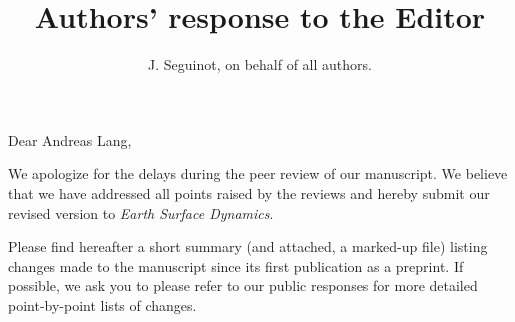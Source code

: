 


\title{Authors' response to the Editor}
\author{J. Seguinot, on behalf of all authors.}


\thispagestyle{empty}
\maketitle
\bigskip

    Dear Andreas Lang,

    We apologize for the delays during the peer review of our manuscript. We
    believe that we have addressed all points raised by the reviews and hereby
    submit our revised version to \emph{Earth Surface Dynamics}.

    Please find hereafter a short summary (and attached, a marked-up file)
    listing changes
    made to the manuscript since its first publication as a preprint. If
    possible, we ask you to please refer to our public responses for more
    detailed point-by-point lists of changes.


